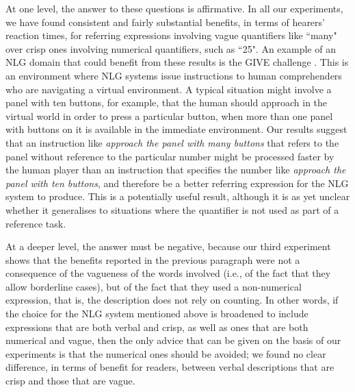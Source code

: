\documentclass[doc,floatmark]{apa}
\begin{document}
At one level, the answer to these questions is affirmative. In all our experiments, we have found consistent and fairly substantial benefits, in terms of hearers' reaction times, for referring expressions involving vague quantifiers like ``many" over crisp ones involving numerical quantifiers, such as ``25". An example of an NLG domain that could benefit from these results is the GIVE challenge \cite{byron2009report} \cite{ koller2010report}. This is an environment where NLG systems issue instructions to human comprehenders who are navigating a virtual environment. A typical situation might involve a panel with ten buttons, for example, that the human should approach in the virtual world in order to press a particular button, when more than one panel with buttons on it is available in the immediate environment. Our results suggest that an instruction like  \emph{approach the panel with many buttons}  that refers to the panel without reference to the particular number might be processed faster by the human player than an instruction that specifies the number like  \emph{approach the panel with ten buttons}, and therefore be a better referring expression for the NLG system to produce. This is a potentially useful result, although it is as yet unclear whether it generalises to situations where the quantifier is not used as part of a reference task.

At a deeper level, the answer must be negative, because our third experiment shows that the benefits reported in the previous paragraph were not a consequence of the vagueness of the words involved (i.e., of the fact that they allow borderline cases), but of the fact that they used a non-numerical expression, that is, the description does not rely on counting. In other words, if the choice for the NLG system mentioned above is broadened to include expressions that are both verbal and crisp, as well as ones that are both numerical and vague, then the only advice that can be given on the basis of our experiments is that the numerical ones should be avoided; we found no clear difference, in terms of benefit for readers, between verbal descriptions that are crisp and those that are vague. 


\end{document}
